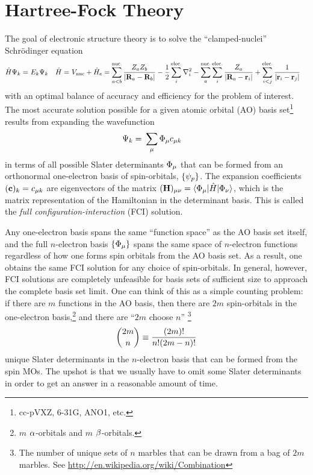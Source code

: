 \documentclass[11pt]{article}
\numberwithin{equation}{section}
\begin{document}
\section{Hartree-Fock Theory}

The goal of electronic structure theory is to solve the ``clamped-nuclei'' Schr\"odinger equation
\begin{align}
\label{eq:electronic-schrodinger-equation}
  \hat{H}\Psi _k
=&\
  E_k\Psi _k
&
  \hat{H}
=&\
  V_{\mathrm{nuc}}
+
  \hat{H}_e
=
  \sum_{a<b}^{\text{nuc.}}
  \frac {Z_aZ_b}{|\mathbf{R}_a-\mathbf{R}_b|}
-
  \frac {1}{2}
  \sum_i^{\text{elec.}}
  \nabla_i^2
-
  \sum_a^{\text{nuc.}}
  \sum_i^{\text{elec.}}
  \frac {Z_a}{|\mathbf{R}_a-\mathbf{r}_i|}
+
  \sum_{i<j}^{\text{elec.}}
  \frac {1}{|\mathbf{r}_i-\mathbf{r}_j|}
\end{align}
with an optimal balance of accuracy and efficiency for the problem of interest.
The most accurate solution possible for a given atomic orbital (AO) basis set\footnote{cc-pVXZ, 6-31G, ANO1, etc.} results from expanding the wavefunction
\begin{align}
\label{eq:full-ci-wavefunction-expansion}
  \Y_k
=&\
  \sum_\mu
  \F_\mu c_{\mu k}
\end{align}
in terms of all possible Slater determinants $\F_\mu$ that can be formed from an orthonormal one-electron basis of spin-orbitals, $\{\psi _p\}$.
The expansion coefficients $(\bo{c})_k=c_{\mu k}$ are eigenvectors of the matrix $(\bo{H})_{\mu\nu}=\ip{\F_\mu|\op{H}|\F_\nu}$, which is the matrix representation of the Hamiltonian in the determinant basis.
This is called the {\it full configuration-interaction} (FCI) solution.

Any one-electron basis spans the same ``function space'' as the AO basis set itself, and the full $n$-electron basis $\{\F_\mu\}$ spans the same space of $n$-electron functions regardless of how one forms spin orbitals from the AO basis set.
As a result, one obtains the same FCI solution for any choice of spin-orbitals.
In general, however, FCI solutions are completely unfeasible for basis sets of sufficient size to approach the complete basis set limit.
One can think of this as a simple counting problem: if there are $m$ functions in the AO basis, then there are $2m$ spin-orbitals in the one-electron basis,\footnote{$m$ $\alpha $-orbitals and $m$ $\beta $-orbitals.} and there are ``$2m$ choose $n$'' \footnote{The number of unique sets of $n$ marbles that can be drawn from a bag of $2m$ marbles.  See \url{http://en.wikipedia.org/wiki/Combination}}
\begin{align*}
{2m \choose n}\equiv\frac {(2m)!}{n!(2m-n)!}
\end{align*}
unique Slater determinants in the $n$-electron basis that can be formed from the spin MOs.
The upshot is that we usually have to omit some Slater determinants in order to get an answer in a reasonable amount of time.
\end{document}
